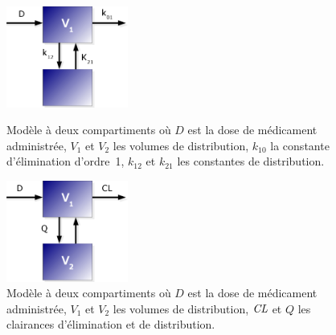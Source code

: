 \begin{figure}[h!]
        \centering \includegraphics[width=4cm]{figures/raster/Figure4_2comp}
        \caption[Modèle à deux compartiments (micro constantes]{Modèle à deux compartiments où $D$ est la dose de médicament administrée, $V_1$ et $V_2$ les volumes de distribution, $k_{10}$ la constante d'élimination d'ordre~1, $k_{12}$ et $k_{21}$ les constantes de distribution.}
	\label{fig:4}
        \centering \includegraphics[width=4cm]{figures/raster/Figure5_2comp_phy}
        \caption[Modèle à deux compartiments (constantes "physiologiques")]{Modèle à deux compartiments où $D$ est la dose de médicament administrée, $V_1$ et $V_2$ les volumes de distribution, $\operatorname{\textit{CL}}$ et $Q$ les clairances d'élimination et de distribution.}
	\label{fig:5}
\end{figure}

%
